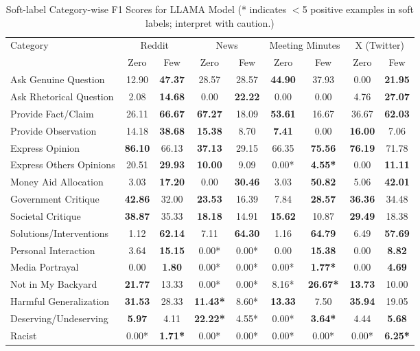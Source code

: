 \begin{table}[htbp]
\centering
\begin{tabular}{l *{8}{c}}
\toprule
Category & \multicolumn{2}{c}{Reddit} & \multicolumn{2}{c}{News} & \multicolumn{2}{c}{Meeting Minutes} & \multicolumn{2}{c}{X (Twitter)} \\
& Zero & Few & Zero & Few & Zero & Few & Zero & Few \\
\midrule
Ask Genuine Question & 12.90 & \textbf{47.37} & 28.57 & 28.57 & \textbf{44.90} & 37.93 & 0.00 & \textbf{21.95} \\
Ask Rhetorical Question & 2.08 & \textbf{14.68} & 0.00 & \textbf{22.22} & 0.00 & 0.00 & 4.76 & \textbf{27.07} \\
Provide Fact/Claim & 26.11 & \textbf{66.67} & \textbf{67.27} & 18.09 & \textbf{53.61} & 16.67 & 36.67 & \textbf{62.03} \\
Provide Observation & 14.18 & \textbf{38.68} & \textbf{15.38} & 8.70 & \textbf{7.41} & 0.00 & \textbf{16.00} & 7.06 \\
Express Opinion & \textbf{86.10} & 66.13 & \textbf{37.13} & 29.15 & 66.35 & \textbf{75.56} & \textbf{76.19} & 71.78 \\
Express Others Opinions & 20.51 & \textbf{29.93} & \textbf{10.00} & 9.09 & 0.00* & \textbf{4.55*} & 0.00 & \textbf{11.11} \\
Money Aid Allocation & 3.03 & \textbf{17.20} & 0.00 & \textbf{30.46} & 3.03 & \textbf{50.82} & 5.06 & \textbf{42.01} \\
Government Critique & \textbf{42.86} & 32.00 & \textbf{23.53} & 16.39 & 7.84 & \textbf{28.57} & \textbf{36.36} & 34.48 \\
Societal Critique & \textbf{38.87} & 35.33 & \textbf{18.18} & 14.91 & \textbf{15.62} & 10.87 & \textbf{29.49} & 18.38 \\
Solutions/Interventions & 1.12 & \textbf{62.14} & 7.11 & \textbf{64.30} & 1.16 & \textbf{64.79} & 6.49 & \textbf{57.69} \\
Personal Interaction & 3.64 & \textbf{15.15} & 0.00* & 0.00* & 0.00 & \textbf{15.38} & 0.00 & \textbf{8.82} \\
Media Portrayal & 0.00 & \textbf{1.80} & 0.00* & 0.00* & 0.00* & \textbf{1.77*} & 0.00 & \textbf{4.69} \\
Not in My Backyard & \textbf{21.77} & 13.33 & 0.00* & 0.00* & 8.16* & \textbf{26.67*} & \textbf{13.73} & 10.00 \\
Harmful Generalization & \textbf{31.53} & 28.33 & \textbf{11.43*} & 8.60* & \textbf{13.33} & 7.50 & \textbf{35.94} & 19.05 \\
Deserving/Undeserving & \textbf{5.97} & 4.11 & \textbf{22.22*} & 4.55* & 0.00* & \textbf{3.64*} & 4.44 & \textbf{5.68} \\
Racist & 0.00* & \textbf{1.71*} & 0.00* & 0.00* & 0.00* & 0.00* & 0.00* & \textbf{6.25*} \\
\bottomrule
\end{tabular}
\centering\caption{Soft-label Category-wise F1 Scores for LLAMA Model (* indicates $<$5 positive examples in soft labels; interpret with caution.)}
\label{tab:llama_category_breakdown}
\end{table}